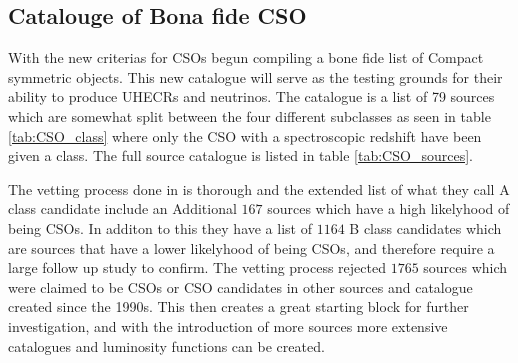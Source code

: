 \subsection{Catalouge of Bona fide CSO}
With the new criterias for CSOs \cite{kiehlmann2023compact} begun compiling a bone fide list of Compact symmetric objects. This new catalogue will serve as the testing grounds for their ability to produce UHECRs and neutrinos. The catalogue is a list of 79 sources which are somewhat split between the four different subclasses as seen in table \ref{tab:CSO_class} where only the CSO with a spectroscopic redshift have been given a class. The full source catalogue is listed in table \ref{tab:CSO_sources}.

The vetting process done in \cite{kiehlmann2023compact} is thorough and the extended list of what they call A class candidate include an Additional $167$ sources which have a high likelyhood of being CSOs. In additon to this they have a list of $1164$ B class candidates which are sources that have a lower likelyhood of being CSOs, and therefore require a large follow up study to confirm. The vetting process rejected $1765$ sources which were claimed to be CSOs or CSO candidates in other sources and catalogue created since the 1990s.  This then creates a great starting block for further investigation, and with the introduction of more sources more extensive catalogues and luminosity functions can be created. 

